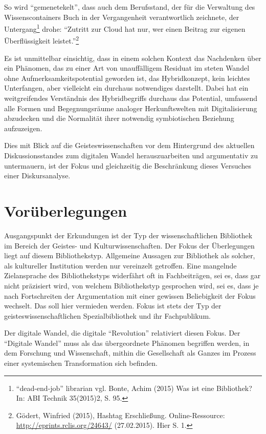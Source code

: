 \documentclass[a4paper,
fontsize=11pt,
oneside,
numbers=noperiodatend,
parskip=half-,
bibliography=totoc,
final
]{scrartcl}
\begin{document}
So wird \enquote{gemenetekelt}, dass auch dem Berufsstand, der für die
Verwaltung des Wissenscontainers Buch in der Vergangenheit
verantwortlich zeichnete, der Untergang\footnote{\enquote{dead-end-job}
  librarian vgl. Bonte, Achim (2015) Was ist eine Bibliothek? In: ABI
  Technik 35(2015)2, S. 95.} drohe: \enquote{Zutritt zur Cloud hat nur,
wer einen Beitrag zur eigenen Überflüssigkeit leistet.}\footnote{Gödert,
  Winfried (2015), Hashtag Erschließung. Online-Ressource:
  \url{http://eprints.rclis.org/24643/} (27.02.2015). Hier S. 1.}

Es ist unmittelbar einsichtig, dass in einem solchen Kontext das
Nachdenken über ein Phänomen, das zu einer Art von unauffälligem
Residuat im steten Wandel ohne Aufmerksamkeitspotential geworden ist,
das Hybridkonzept, kein leichtes Unterfangen, aber vielleicht ein
durchaus notwendiges darstellt. Dabei hat ein weitgreifendes Verständnis
des Hybridbegriffs durchaus das Potential, umfassend alle Formen und
Begegnungsräume analoger Herkunftswelten mit Digitalisierung abzudecken
und die Normalität ihrer notwendig symbiotischen Beziehung aufzuzeigen.

Dies mit Blick auf die Geisteswissenschaften vor dem Hintergrund des
aktuellen Diskussionsstandes zum digitalen Wandel herauszuarbeiten und
argumentativ zu untermauern, ist der Fokus und gleichzeitig die
Beschränkung dieses Versuches einer Diskursanalyse.

\section*{Vorüberlegungen}\label{voruxfcberlegungen}

Ausgangspunkt der Erkundungen ist der Typ der wissenschaftlichen
Bibliothek im Bereich der Geistes- und Kulturwissenschaften. Der Fokus
der Überlegungen liegt auf diesem Bibliothekstyp. Allgemeine Aussagen
zur Bibliothek als solcher, als kultureller Institution werden nur
vereinzelt getroffen. Eine mangelnde Zielansprache des Bibliothekstyps
widerfährt oft in Fachbeiträgen, sei es, dass gar nicht präzisiert wird,
von welchem Bibliothekstyp gesprochen wird, sei es, dass je nach
Fortschreiten der Argumentation mit einer gewissen Beliebigkeit der
Fokus wechselt. Das soll hier vermieden werden. Fokus ist stets der Typ
der geisteswissenschaftlichen Spezialbibliothek und ihr Fachpublikum.

Der digitale Wandel, die digitale \enquote{Revolution} relativiert
diesen Fokus. Der \enquote{Digitale Wandel} muss als das übergeordnete
Phänomen begriffen werden, in dem Forschung und Wissenschaft, mithin die
Gesellschaft als Ganzes im Prozess einer systemischen Transformation
sich befinden.
\end{document}
